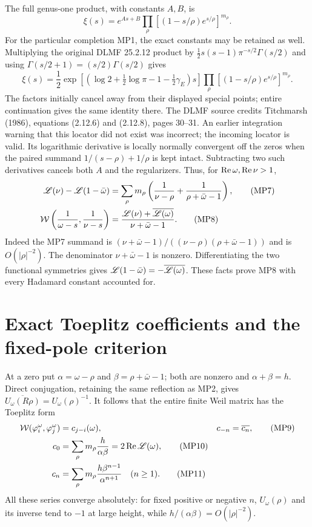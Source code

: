 \documentclass[11pt]{article}
\begin{document}
The full genus-one product, with constants $A,B$, is
\begin{equation}
 \xi(s)=e^{As+B}\prod_\rho
       \left[(1-s/\rho)e^{s/\rho}\right]^{m_\rho}.
 \tag{MP6}
\end{equation}
For the particular completion MP1, the exact constants may be retained
as well. Multiplying the original DLMF 25.2.12 product by
$\tfrac12s(s-1)\pi^{-s/2}\Gamma(s/2)$ and using
$\Gamma(s/2+1)=(s/2)\Gamma(s/2)$ gives
\begin{equation}
 \xi(s)=\frac12\exp\!\left[
  \left(\log2+\tfrac12\log\pi-1-\tfrac12\gamma_E\right)s\right]
 \prod_\rho\left[(1-s/\rho)e^{s/\rho}\right]^{m_\rho}.
 \tag{MP6a}
\end{equation}
The factors initially cancel away from their displayed special points;
entire continuation gives the same identity there. The DLMF source
credits Titchmarsh (1986), equations (2.12.6) and (2.12.8), pages 30--31.
An earlier integration warning that this locator did not exist was
incorrect; the incoming locator is valid.
Its logarithmic derivative is locally normally convergent off the zeros
when the paired summand $1/(s-\rho)+1/\rho$ is kept intact. Subtracting
two such derivatives cancels both $A$ and the regularizers. Thus, for
$\operatorname{Re}\omega,\operatorname{Re}\nu>1$,
\begin{align}
 \mathscr L(\nu)-\mathscr L(1-\bar\omega)
 &=\sum_\rho m_\rho
       \left(\frac1{\nu-\rho}+\frac1{\rho+\bar\omega-1}\right),\tag{MP7}\\
 \mathcal W\left(\frac1{\omega-s},\frac1{\nu-s}\right)
 &=\frac{\mathscr L(\nu)+\overline{\mathscr L(\omega)}}{\nu+\bar\omega-1}.
 \tag{MP8}
\end{align}
Indeed the MP7 summand is
$(\nu+\bar\omega-1)/((\nu-\rho)(\rho+\bar\omega-1))$ and is
$O(|\rho|^{-2})$. The denominator $\nu+\bar\omega-1$ is nonzero.
Differentiating the two functional symmetries gives
$\mathscr L(1-\bar\omega)=-\overline{\mathscr L(\omega)}$. These facts prove MP8
with every Hadamard constant accounted for.

\section{Exact Toeplitz coefficients and the fixed-pole criterion}
At a zero put $\alpha=\omega-\rho$ and $\beta=\rho+\bar\omega-1$;
both are nonzero and $\alpha+\beta=h$. Direct conjugation, retaining the
same reflection as MP2, gives
$\overline{U_\omega(R\rho)}=U_\omega(\rho)^{-1}$.
It follows that the entire finite Weil matrix has the Toeplitz form
\begin{align}
 \mathcal W(\varphi_i^\omega,\varphi_j^\omega)&=c_{j-i}(\omega),
   &c_{-n}&=\overline{c_n},\tag{MP9}\\
 c_0&=\sum_\rho m_\rho\frac h{\alpha\beta}
             =2\operatorname{Re}\mathscr L(\omega),\tag{MP10}\\
 c_n&=\sum_\rho m_\rho\frac{h\beta^{n-1}}{\alpha^{n+1}}
       \quad(n\geq1).\tag{MP11}
\end{align}
All these series converge absolutely: for fixed positive or negative
$n$, $U_\omega(\rho)$ and its inverse tend to $-1$ at large height,
while $h/(\alpha\beta)=O(|\rho|^{-2})$.
\end{document}
